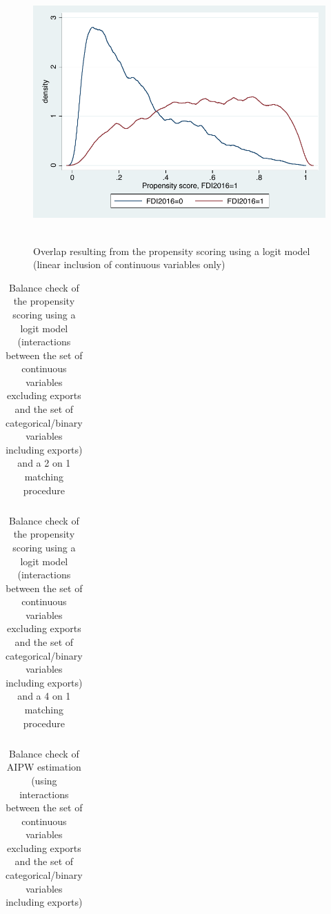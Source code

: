 \begin{figure}
	\centering
	\includegraphics[scale=0.6]{figures_and_tables/3_overlap_linearlogit1o1_reduced.pdf}\
	\caption{Overlap resulting from the propensity scoring using a logit model (linear inclusion of continuous variables only)}
	\label{ol_linlog1_red}
\end{figure}

\begin{table}
	\begin{tabular}{lcccc}
		 \hline \hline
	
	 \hline \hline
	\end{tabular}
	\caption{Balance check of the propensity scoring using a logit model (interactions between the set of continuous variables excluding exports and the set of categorical/binary variables including exports) and a 2 on 1 matching procedure}
	\label{bal_intcatlog2}
\end{table}

\begin{table}
	\begin{tabular}{lcccc}
		 \hline \hline
	
	 \hline \hline
	\end{tabular}
	\caption{Balance check of the propensity scoring using a logit model (interactions between the set of continuous variables excluding exports and the set of categorical/binary variables including exports) and a 4 on 1 matching procedure}
	\label{bal_intcatlog4}
\end{table}

\begin{table}
	\begin{tabular}{lcccc}
		 \hline \hline
		
		 \hline \hline
	\end{tabular}
	\caption{Balance check of AIPW estimation (using interactions between the set of continuous variables excluding exports and the set of categorical/binary variables including exports)} 
	\label{bal_aipw}
\end{table}
